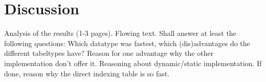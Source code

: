 \documentclass[a4paper,11pt,twoside]{article}
\begin{document}
\section{Discussion}
Analysis of the results (1-3 pages). Flowing text. Shall answer at
least the following questions:
Which datatype was fastest, which (dis)advantages do the different
tabeltypes have? Reason for one advantage why the other implementation
don't offer it. Reasoning about dynamic/static implementation. If
done, reason why the direct indexing table is so fast.


\end{document}
